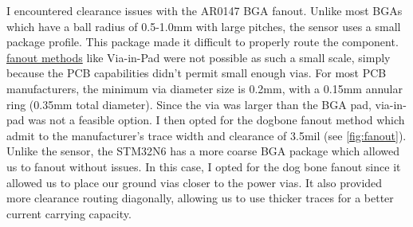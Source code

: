 I encountered clearance issues with the AR0147 BGA fanout. Unlike most BGAs which have a ball radius of 0.5-1.0mm with large pitches, the sensor uses a small package profile. This package made it difficult to properly route the component.
\href{https://resources.altium.com/p/which-bga-pad-and-fanout-strategy-right-your-pcb}{fanout methods} like Via-in-Pad were not possible as such a small scale, simply because the PCB capabilities didn't permit small enough vias.
For most PCB manufacturers, the minimum via diameter size is 0.2mm, with a 0.15mm annular ring (0.35mm total diameter). Since the via was larger than the BGA pad, via-in-pad was not a feasible option.
I then opted for the dogbone fanout method which admit to the manufacturer's trace width and clearance of 3.5mil (see \autoref{fig:fanout}). Unlike the sensor, the STM32N6 has a more coarse BGA package which allowed us to fanout without issues. In this case, I opted for the dog bone fanout since it allowed us to place our ground vias closer to the power vias. It also provided more clearance routing diagonally, allowing us to use thicker traces for a better current carrying capacity.
